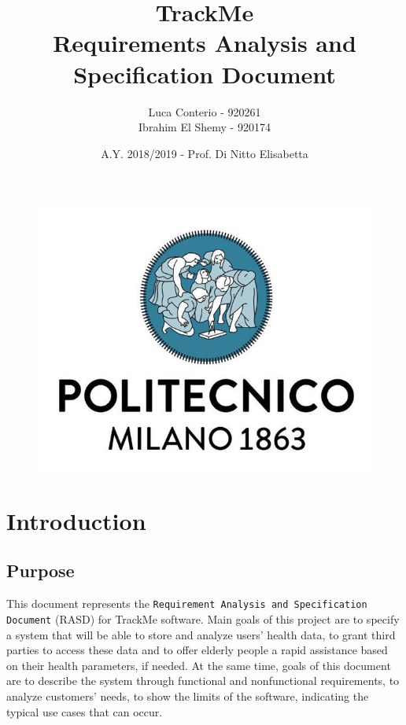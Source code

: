\documentclass[12pt,a4paper]{article}
\author{Luca Conterio - 920261\\  
		  Ibrahim El Shemy - 920174}
\date{A.Y. 2018/2019 - Prof. Di Nitto Elisabetta}
\title{%
	\textbf{TrackMe} \\
	\large Requirements Analysis and Specification Document
}
\begin{document}
	
	\begin{figure}
		\centering
		\includegraphics[width=1.0\linewidth]{images/polimi.jpg}
	\end{figure}
	
	\maketitle

	\newpage
	\tableofcontents
	\newpage
	
	\section{Introduction}
		\subsection{Purpose}
		 This document represents the \texttt{Requirement Analysis and Specification Document} (RASD) for TrackMe software. Main goals of this project are to specify a system that will be able to store and analyze users' health data, to grant third parties to access these data and to offer elderly people a rapid assistance based on their health parameters, if needed.
		 At the same time, goals of this document are to describe the system through functional and nonfunctional requirements, to analyze customers' needs, to show the limits of the software, indicating the typical use cases that can occur.
\end{document}
